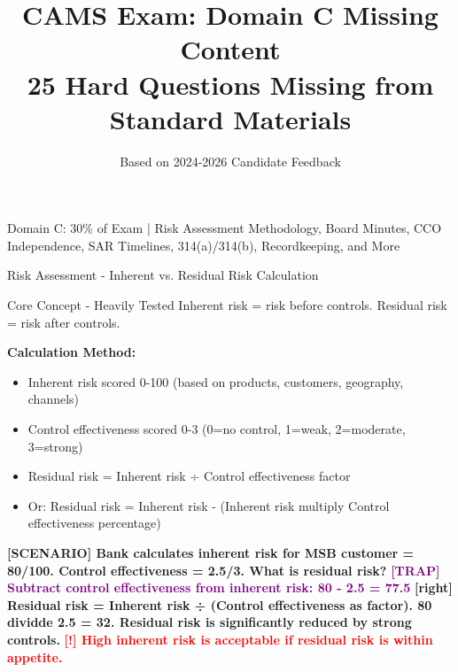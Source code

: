 \documentclass[11pt,a4paper]{beamer}
\title[CAMS Domain C - Missing Hard Questions]{CAMS Exam: Domain C Missing Content\\25 Hard Questions Missing from Standard Materials}
\author{Based on 2024-2026 Candidate Feedback}
\date{}
\newcommand{\redflag}[1]{\textcolor{red}{\textbf{[!] #1}}}
\newcommand{\trap}[1]{\textcolor{purple}{\textbf{[TRAP] #1}}}
\newcommand{\correct}[1]{\textcolor{green!50!black}{\textbf{[right] #1}}}
\newcommand{\scenario}[1]{\textcolor{blue!70!black}{\textbf{[SCENARIO] #1}}}
\begin{document}
\begin{frame}
\titlepage
\centering
\tiny Domain C: 30\% of Exam | Risk Assessment Methodology, Board Minutes, CCO Independence, SAR Timelines, 314(a)/314(b), Recordkeeping, and More
\end{frame}


\begin{frame}{Risk Assessment - Inherent vs. Residual Risk Calculation}
\begin{block}{Core Concept - Heavily Tested}
Inherent risk = risk before controls. Residual risk = risk after controls.
\end{block}
\textbf{Calculation Method:}
\begin{itemize}
\item Inherent risk scored 0-100 (based on products, customers, geography, channels)
\item Control effectiveness scored 0-3 (0=no control, 1=weak, 2=moderate, 3=strong)
\item Residual risk = Inherent risk ÷ Control effectiveness factor
\item Or: Residual risk = Inherent risk - (Inherent risk multiply Control effectiveness percentage)
\end{itemize}
\scenario{Bank calculates inherent risk for MSB customer = 80/100. Control effectiveness = 2.5/3. What is residual risk?}
\trap{Subtract control effectiveness from inherent risk: 80 - 2.5 = 77.5}
\correct{Residual risk = Inherent risk ÷ (Control effectiveness as factor). 80 dividde 2.5 = 32. Residual risk is significantly reduced by strong controls.}
\redflag{High inherent risk is acceptable if residual risk is within appetite.}
\end{frame}
\end{document}
